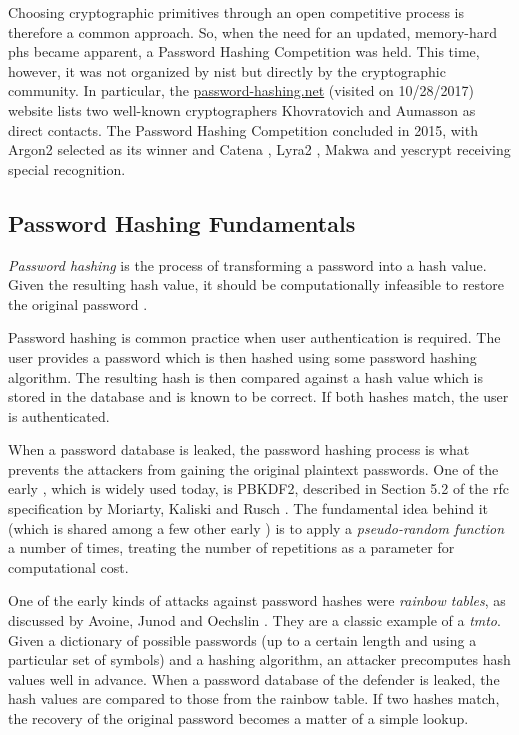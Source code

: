 Choosing cryptographic primitives through an open competitive process is therefore a common approach. So, when the need for an updated, memory-hard \gls{phs} became apparent, a Password Hashing Competition was held. This time, however, it was not organized by \gls{nist} but directly by the cryptographic community. In particular, the \url{password-hashing.net} (visited on 10/28/2017) website lists two well-known cryptographers Khovratovich and Aumasson as direct contacts. The Password Hashing Competition concluded in 2015, with Argon2 \cite{biryukov:2015:argon2} selected as its winner and Catena \cite{forler:2013:catena}, Lyra2 \cite{andrade:2016:lyra2}, Makwa \cite{pornin:2015:makwa} and yescrypt \cite{peslyak:2015:yescrypt} receiving special recognition.

\subsection{Password Hashing Fundamentals}
\label{sec:fundamentals}

\emph{Password hashing} is the process of transforming a password into a hash value. Given the resulting hash value, it should be computationally infeasible to restore the original password \cite{marcos:2015:lyra2}.

Password hashing is common practice when user authentication is required. The user provides a password which is then hashed using some password hashing algorithm. The resulting hash is then compared against a hash value which is stored in the database and is known to be correct. If both hashes match, the user is authenticated.

When a password database is leaked, the password hashing process is what prevents the attackers from gaining the original plaintext passwords. One of the early , which is widely used today, is PBKDF2, described in Section 5.2 of the \gls{rfc} specification by Moriarty, Kaliski and Rusch \cite{moriarty:2017:pkcs}. The fundamental idea behind it (which is shared among a few other early ) is to apply a \emph{pseudo-random function} a number of times, treating the number of repetitions as a parameter for computational cost.

One of the early kinds of attacks against password hashes were \emph{rainbow tables}, as discussed by Avoine, Junod and Oechslin \cite{Avoine:2008:CIT:1380564.1380565}. They are a classic example of a \emph{\gls{tmto}}. Given a dictionary of possible passwords (up to a certain length and using a particular set of symbols) and a hashing algorithm, an attacker precomputes hash values well in advance. When a password database of the defender is leaked, the hash values are compared to those from the rainbow table. If two hashes match, the recovery of the original password becomes a matter of a simple lookup.

